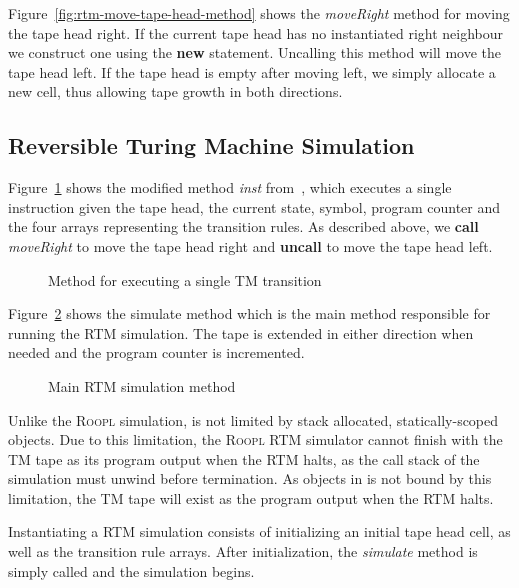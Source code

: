 Figure~\ref{fig:rtm-move-tape-head-method} shows the \textit{moveRight} method for moving the tape head right. If the current tape head has no instantiated right neighbour we construct one using the \textbf{new} statement. Uncalling this method will move the tape head left. If the tape head is empty after moving left, we simply allocate a new cell, thus allowing tape growth in both directions. 

\subsection{Reversible Turing Machine Simulation}
\label{subsec:rtm-simulation}
Figure~\ref{fig:rtm-instruction-method} shows the modified method \textit{inst} from~\cite{ty:ejanus}, which executes a single instruction given the tape head, the current state, symbol, program counter and the four arrays representing the transition rules. As described above, we \textbf{call} \textit{moveRight} to move the tape head right and \textbf{uncall} to move the tape head left. 

\begin{figure}[ht]
    \centering
    
    \caption{Method for executing a single TM transition}
    \label{fig:rtm-instruction-method}
\end{figure}

Figure~\ref{fig:rtm-simulation-method} shows the simulate method which is the main method responsible for running the RTM simulation. The tape is extended in either direction when needed and the program counter is incremented.

\begin{figure}[ht]
    \centering
    
    \caption{Main RTM simulation method}
    \label{fig:rtm-simulation-method}
\end{figure} 

Unlike the \textsc{Roopl} simulation, \rooplpp is not limited by stack allocated, statically-scoped objects. Due to this limitation, the \textsc{Roopl} RTM simulator cannot finish with the TM tape as its program output when the RTM halts, as the call stack of the simulation must unwind before termination. As objects in \rooplpp is not bound by this limitation, the TM tape will exist as the program output when the RTM halts.

Instantiating a RTM simulation consists of initializing an initial tape head cell, as well as the transition rule arrays. After initialization, the \textit{simulate} method is simply called and the simulation begins.
